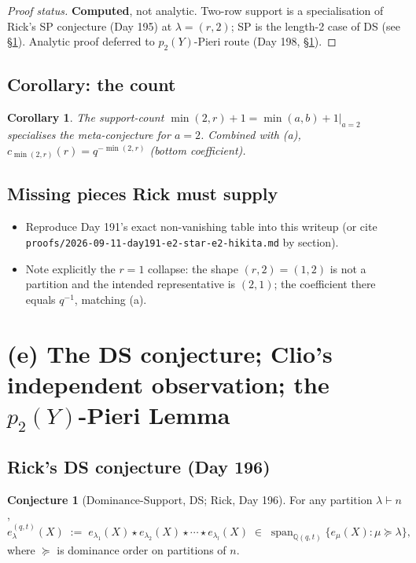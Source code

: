 \documentclass[11pt]{article}
\newtheorem{corollary}[theorem]{Corollary}
\theoremstyle{definition}
\newtheorem{conjecture}[theorem]{Conjecture}
\begin{document}
\begin{proof}[Proof status]
\textbf{Computed}, not analytic. Two-row support is a specialisation
of Rick's SP conjecture (Day 195) at $\lambda=(r,2)$; SP is the
length-2 case of DS (see \S\ref{sec:ds}). Analytic proof deferred to
$p_2(Y)$-Pieri route (Day 198, \S\ref{sec:ds}).
\end{proof}

\subsection*{Corollary: the count}
\begin{corollary}
The support-count $\min(2,r)+1 = \min(a,b)+1|_{a=2}$ specialises the
meta-conjecture for $a=2$. Combined with (a), $c_{\min(2,r)}(r) =
q^{-\min(2,r)}$ (bottom coefficient).
\end{corollary}

\subsection*{Missing pieces Rick must supply}
\begin{itemize}[leftmargin=1.5em]
  \item Reproduce Day 191's exact non-vanishing table into this
        writeup (or cite \verb|proofs/2026-09-11-day191-e2-star-e2-hikita.md|
        by section).
  \item Note explicitly the $r=1$ collapse: the shape $(r,2)=(1,2)$
        is not a partition and the intended representative is
        $(2,1)$; the coefficient there equals $q^{-1}$, matching (a).
\end{itemize}

\section{(e) The DS conjecture; Clio's independent observation; the $p_2(Y)$-Pieri Lemma}
\label{sec:ds}

\subsection*{Rick's DS conjecture (Day 196)}
\begin{conjecture}[Dominance-Support, DS; Rick, Day 196]\label{conj:DS}
For any partition $\lambda\vdash n$,
\begin{equation}\label{eq:DS}
  e_\lambda^{(q,t)}(X)
    \;:=\; e_{\lambda_1}(X)\star e_{\lambda_2}(X)\star\cdots\star e_{\lambda_l}(X)
    \;\in\; \operatorname{span}_{\mathbb Q(q,t)}\bigl\{e_\mu(X):\mu\succeq\lambda\bigr\},
\end{equation}
where $\succeq$ is dominance order on partitions of $n$.
\end{conjecture}
\end{document}
